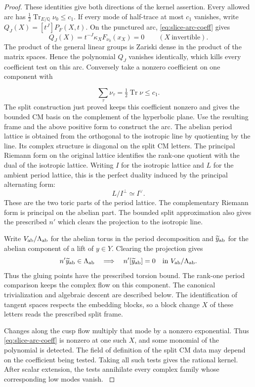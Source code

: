 \begin{proof}
These identities give both directions of the kernel assertion.
Every allowed arc has
\(\tfrac12\operatorname{Tr}_{E/\mathbb Q}\nu_0\le c_1\).
If every mode of half-trace at most \(c_1\) vanishes, write \(Q_J(X)=[t^J]P_F(X,t)\). On the punctured arc, \eqref{eq:slice-arc-coeff} gives
\[
 Q_J(X)=t^{-J}\kappa_X F_{\nu_0}(x_X)=0
       \qquad (X\ \text{invertible}).
\]
The product of the general linear groups is Zariski dense in the product of the matrix spaces. Hence the polynomial \(Q_J\) vanishes identically, which kills every coefficient test on this arc. Conversely take a nonzero
coefficient on one component with

\[
  \sum_\tau\nu_\tau=\tfrac12\operatorname{Tr}\nu\le c_1.
\]
The split construction just proved keeps this coefficient nonzero
and gives the bounded CM basis on the complement of the hyperbolic
plane. Use the resulting frame and the above positive form
to construct the arc. The abelian period lattice is obtained
from the orthogonal to the isotropic line by quotienting by
the line. Its complex structure is diagonal on the split CM
letters. The principal Riemann form on the original lattice
identifies the rank-one quotient with the dual of the isotropic
lattice.
Writing \(I\) for the isotropic lattice and \(L\) for the ambient period lattice, this is the perfect duality induced by the principal alternating form:
\[
  L/I^\perp\simeq I^\vee .
\]
 These are the two toric parts of the period lattice.
The complementary Riemann form is principal on the abelian
part. The bounded split approximation also gives the prescribed
\(n'\) which clears the projection to the isotropic line.

Write \(V_{\rm ab}/\Lambda_{\rm ab}\) for the abelian torus in the period decomposition and \(\widetilde y_{\rm ab}\) for the abelian component of a lift of \(y\in Y\). Clearing the projection gives
\[
       n'\widetilde y_{\rm ab}\in\Lambda_{\rm ab}
       \quad\Longrightarrow\quad
       n'[\widetilde y_{\rm ab}]=0\quad\text{in }V_{\rm ab}/\Lambda_{\rm ab}.
\]
Thus the gluing points have the prescribed torsion bound. The rank-one period
comparison keeps the complex flow on this component. The
canonical trivialization and algebraic descent are described
below. The identification of tangent spaces respects the embedding blocks,
so a block change \(X\) of these letters reads the prescribed
split frame.

Changes along the cusp flow multiply that mode by
a nonzero exponential. Thus \eqref{eq:slice-arc-coeff} is
nonzero at one such \(X\), and some monomial of the polynomial
is detected. The field of definition of the split CM data may depend on the coefficient being tested. Taking all such tests gives the rational kernel. After scalar extension, the tests annihilate every complex family whose corresponding low modes vanish.
\label{cor:slice-cm-coefficients-3}

\end{proof}

